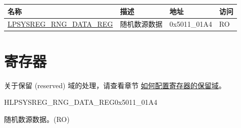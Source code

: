 \documentclass[main\_\_CN.tex]{subfiles}
\begin{document}
\begin{table}[H]
    \centering
    \begin{tabular}{ | l | l | l | l |  }
    \hline
    \rowcolor{lightgray}
    \textbf{名称} & \textbf{描述} & \textbf{地址} & \textbf{访问} \\
    \hline
    \hyperref[regdesc:LPSYSREGRNGDATAREG]{LPSYSREG\_RNG\_DATA\_REG} & 随机数源数据 & 0x5011\_01A4 & RO \\ \hline
    \end{tabular}
\end{table}





\newpage
\section{寄存器}


关于保留 (reserved) 域的处理，请查看章节 \hyperref[programming-reserved-field]{如何配置寄存器的保留域}。

\begin{register}{H}{LPSYSREG\_RNG\_DATA\_REG}{0x5011\_01A4}\label{regdesc:LPSYSREGRNGDATAREG}
%
\regnewline%
\begin{regdesc}\begin{reglist}
\label{fielddesc:LPSYSREGRNGDATA}\item [LPSYSREG\_RNG\_DATA] 随机数源数据。(RO)
\end{reglist}\end{regdesc}
\end{register}
\end{document}
